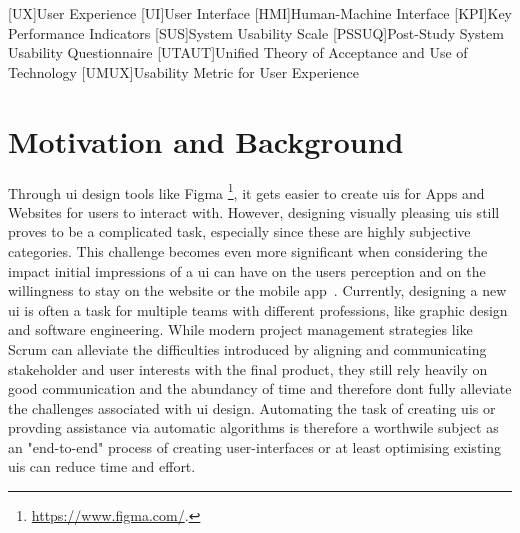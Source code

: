 \documentclass[10pt,a4paper]{scrartcl} %
\begin{document}
\pagestyle{plain}
\title{\rmfamily\normalfont{}}
\subtitle{\rmfamily{}}
\author{}

\maketitle
\begin{acronym}
    [UX]{User Experience}
    [UI]{User Interface}
    [HMI]{Human-Machine Interface}
    [KPI]{Key Performance Indicators}
    [SUS]{System Usability Scale}
    [PSSUQ]{Post-Study System Usability Questionnaire}
    [UTAUT]{Unified Theory of Acceptance and Use of Technology}
    [UMUX]{Usability Metric for User Experience}
\end{acronym}

\section{Motivation and Background}
Through \ac{ui} design tools like Figma \footnote{\url{https://www.figma.com/}.}, it gets easier to create \acp{ui} for Apps and Websites for users to interact with. However, designing visually pleasing \acp{ui} still 
proves to be a complicated task, especially since these are highly subjective categories. \cite{vonwangenheim2018agree}
This challenge becomes even more significant when considering the impact initial 
impressions of a \ac{ui} can have on the users perception and on the willingness to stay on 
the website or the mobile app~\cite{effects_of_website_designs}. Currently, designing a 
new \ac{ui} is often a task for multiple teams with different professions, 
like graphic design and software engineering. 
While modern project management strategies
 like Scrum can alleviate the difficulties introduced by aligning and communicating 
 stakeholder and user interests with the final product, they still rely heavily on good
 communication and the abundancy of time and therefore dont fully alleviate the challenges associated with \ac{ui} design. 
 Automating the task of creating \acp{ui} or provding assistance 
 via automatic algorithms is therefore a worthwile subject as an "end-to-end" process 
 of creating user-interfaces or at least optimising existing \acp{ui} can reduce time 
and effort. 
\end{document}
